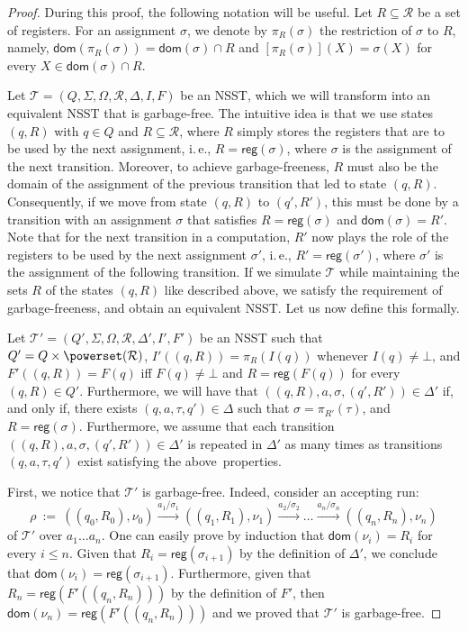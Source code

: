 \documentclass[
a4paper
]{article}
\theoremstyle{plain}
\theoremstyle{definition}
\theoremstyle{remark}
\newcommand{\dom}{\operatorname{dom}}
\newcommand{\Reg}{\mathcal{R}}
\newcommand{\nsst}{\mathcal{T}}
\newcommand{\reg}{\operatorname{reg}}
\renewcommand{\operatorname}[1]{\textsf{#1}}
\begin{document}
\begin{proof}
During this proof, the following notation will be useful. Let $R \subseteq \Reg$ be a set of registers. For an assignment $\sigma$, we denote by $\pi_R(\sigma)$ the restriction of $\sigma$ to $R$, namely, $\dom(\pi_R(\sigma)) = \dom(\sigma) \cap R$ and $[\pi_R(\sigma)](X) = \sigma(X)$ for every $X \in \dom(\sigma) \cap R$.  
	
	
Let $\nsst = (Q, \Sigma, \Omega,  \Reg, \Delta, I, F)$ be an NSST, which we will transform into an equivalent NSST that is garbage-free. The intuitive idea is that we use states $(q, R)$ with $q \in Q$ and $R \subseteq \Reg$, where $R$ simply stores the registers that are to be used by the next assignment, i.\,e., $R = \reg(\sigma)$, where $\sigma$ is the assignment of the next transition. Moreover, to achieve garbage-freeness, $R$ must also be the domain of the assignment of the previous transition that led to state $(q, R)$. Consequently, if we move from state $(q, R)$ to $(q', R')$, this must be done by a transition with an assignment $\sigma$ that satisfies $R = \reg(\sigma)$ and $\dom(\sigma) = R'$. Note that for the next transition in a computation, $R'$ now plays the role of the registers to be used by the next assignment $\sigma'$, i.\,e., $R' = \reg(\sigma')$, where $\sigma'$ is the assignment of the following transition. If we simulate $\nsst$ while maintaining the sets $R$ of the states $(q, R)$ like described above, we satisfy the requirement of garbage-freeness, and obtain an equivalent NSST. Let us now define this formally.
	
	Let $\nsst' = (Q', \Sigma, \Omega, \Reg, \Delta', I', F')$ be an NSST such that $Q' = Q \times \powerset(\Reg)$, $I'((q,R)) = \pi_R(I(q))$ whenever $I(q) \neq \bot$, and $F'((q,R)) = F(q)$ iff $F(q) \neq \bot$ and $R = \reg(F(q))$ for every $(q, R) \in Q'$.
	Furthermore, we will have that $((q,R), a, \sigma, (q',R')) \in \Delta'$ if, and only if, there exists $(q, a, \tau, q') \in \Delta$ such that $\sigma = \pi_{R'}(\tau)$, and
	$R = \reg(\sigma)$.
	Furthermore, we assume that each transition $((q,R), a, \sigma, (q',R')) \in \Delta'$ is repeated in $\Delta'$ as many times as transitions $(q, a, \tau, q')$ exist satisfying the above~properties.
	
	First, we notice that $\nsst'$ is garbage-free. Indeed, consider an accepting run:
	\begin{equation*}
		\rho \ := \ ((q_0, R_0), \nu_0) \xrightarrow{a_1/\sigma_1} ((q_1, R_1), \nu_1) \xrightarrow{a_2 /\sigma_2} \ldots \xrightarrow{a_n/\sigma_{n}} ((q_{n}, R_n), \nu_n)
	\end{equation*}
	of $\nsst'$ over $a_1\ldots a_n$. One can easily prove by induction that $\dom(\nu_i) = R_i$ for every $i \leq n$. Given that $R_i = \reg(\sigma_{i+1})$ by the definition of $\Delta'$, we conclude that $\dom(\nu_i) = \reg(\sigma_{i+1})$. Furthermore, given that $R_n = \reg(F'((q_n, R_n)))$ by the definition of $F'$, then $\dom(\nu_n) = \reg(F'((q_n, R_n)))$ and we proved that $\nsst'$ is garbage-free.
	

\end{proof}
\end{document}
